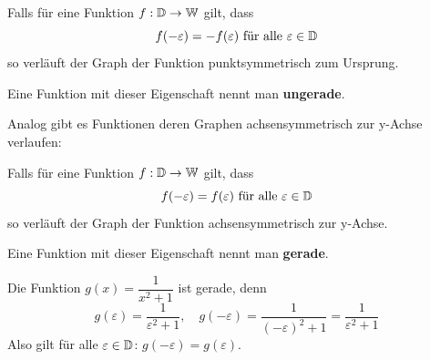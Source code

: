 \begin{deff}{}
    Falls für eine Funktion $f: \operatorname{\mathbb{D}}\to \operatorname{\mathbb{W}}$ gilt, dass
    \[f(-\varepsilon)=-f(\varepsilon) \text{ für alle } \varepsilon \in \operatorname{\mathbb{D}}\]
    so verläuft der Graph der Funktion punktsymmetrisch zum Ursprung.

    Eine Funktion mit dieser Eigenschaft nennt man \textbf{ungerade}.
\end{deff}
Analog gibt es Funktionen deren Graphen achsensymmetrisch zur y-Achse verlaufen:
\begin{deff}{}
    Falls für eine Funktion $f: \operatorname{\mathbb{D}}\to \operatorname{\mathbb{W}}$ gilt, dass
    \[f(-\varepsilon)=f(\varepsilon) \text{ für alle } \varepsilon \in \operatorname{\mathbb{D}}\]
    so verläuft der Graph der Funktion achsensymmetrisch zur y-Achse.

    Eine Funktion mit dieser Eigenschaft nennt man \textbf{gerade}.
\end{deff}
\begin{example}
    \begin{minipage}{0.6\textwidth}
        Die Funktion $g(x)=\dfrac{1}{x^2+1}$ ist gerade, denn
        \[
            g(\varepsilon)= \dfrac{1}{\varepsilon^2+1}, \quad g(-\varepsilon) = \dfrac{1}{(-\varepsilon)^2+1} = \dfrac{1}{\varepsilon^2+1}
        \]
        Also gilt für alle $\varepsilon \in \operatorname{\mathbb{D}}$: $g(-\varepsilon) = g(\varepsilon)$.
    \end{minipage}
    \begin{minipage}{0.4\textwidth}
        \begin{center}
        \end{center}
    \end{minipage}
\end{example}
\vspace{1cm}

